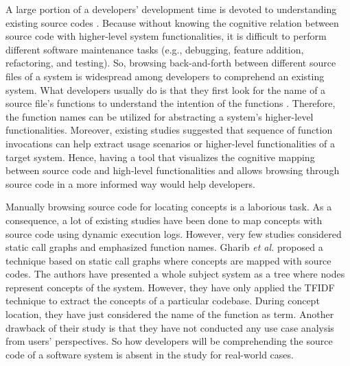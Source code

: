 A large portion of a developers' development time is devoted to understanding existing source codes \cite{corbi1989program, minelli2015know, ko2006exploratory}. Because without knowing the cognitive relation between source code with higher-level system functionalities, it is difficult to perform different software maintenance tasks (e.g., debugging, feature addition, refactoring, and testing). So, browsing back-and-forth between different source files of a system is widespread among developers to comprehend an existing system. What developers usually do is that they first look for the name of a source file's functions to understand the intention of the functions \cite{de2012IRMethodsArtifacts, starke2009searching}. Therefore, the function names can be utilized for abstracting a system's higher-level functionalities. Moreover, existing studies suggested that \cite{salah2005scenariographerReverseEngineering,pradel2009automaticUseageSpecification} sequence of function invocations can help extract usage scenarios or higher-level functionalities of a target system. Hence, having a tool that visualizes the cognitive mapping between source code and high-level functionalities and allows browsing through source code in a more informed way would help developers.

Manually browsing source code for locating concepts is a laborious task. As a consequence, a lot of existing studies have been done to map concepts with source code using dynamic execution logs. However, very few studies considered static call graphs and emphasized function names. Gharib \textit{et al.} \cite{gharibi2018automaticStaticCluster} proposed a technique based on static call graphs where concepts are mapped with source codes. The authors have presented a whole subject system as a tree where nodes represent concepts of the system. However, they have only applied the TFIDF technique to extract the concepts of a particular codebase. During concept location, they have just considered the name of the function as term. Another drawback of their study is that they have not conducted any use case analysis from users' perspectives. So how developers will be comprehending the source code of a software system is absent in the study for real-world cases.

